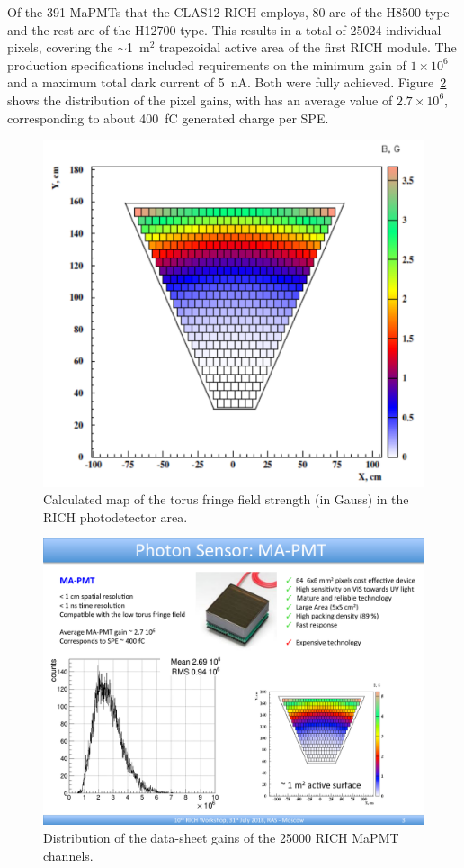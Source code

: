 \documentclass[5p,times,twocolumn]{elsarticle}
\begin{document}
Of the 391 MaPMTs that the CLAS12 RICH employs, 80 are of the H8500 type and the rest are of the H12700 type.
This results in a total of 25024 individual pixels, covering the $\sim$1~m$^2$ trapezoidal active area of the first
RICH module.
The production specifications included requirements on the minimum gain of $1 \times 10^6$ and a maximum total dark
current of 5~nA. Both were fully achieved. Figure~\ref{fig:MaPMTGain} shows the distribution of the pixel gains, with
has an average value of $2.7 \times 10^6$, corresponding to about 400~fC generated charge per SPE.

\begin{figure}[t]
\begin{center}
\includegraphics[width=0.85\columnwidth]{Field.pdf}
\end{center}
\caption{Calculated map of the torus fringe field strength (in Gauss) in the RICH photodetector area.}
\label{fig:MagFringe}
\end{figure}

\begin{figure}[t]
\begin{center}
\includegraphics[width=0.85\columnwidth]{Gain.pdf}
\end{center}
\caption{Distribution of the data-sheet gains of the 25000 RICH MaPMT channels.}
\label{fig:MaPMTGain}
\end{figure}
\end{document}
